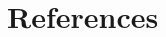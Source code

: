 \documentclass[pdftex,12pt,a4paper]{article}
\begin{document}
\vspace{20mm}

\clearpage	%



\section{References}	%
\begin{multicols}{2}	%
	\small	%
	\renewcommand{\refname}{ \vspace{-\baselineskip}\vspace{-1.1mm} }	%
	\renewcommand{\section}[2]{}	%
\end{multicols}
\end{document}
